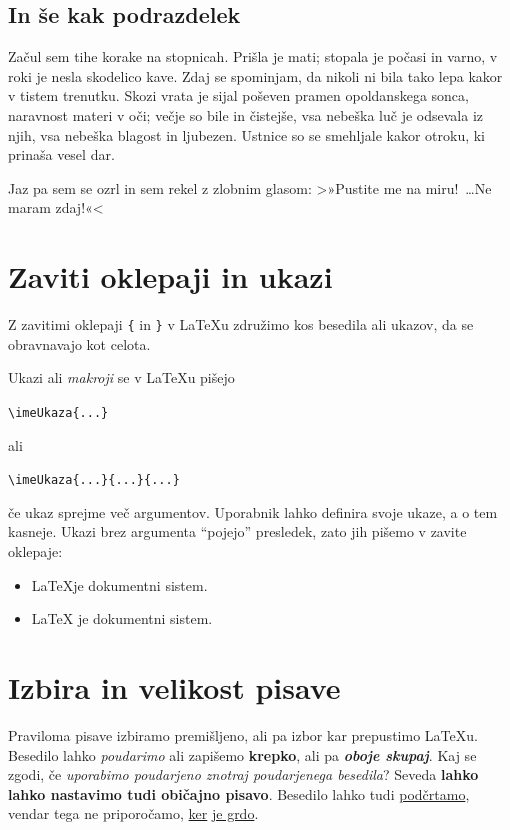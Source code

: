 \documentclass[a4paper]{article}
\begin{document}
\subsection{In še kak podrazdelek}

Začul sem tihe korake na stopnicah. Prišla je mati; stopala je počasi in varno, v roki je
nesla skodelico kave. Zdaj se spominjam, da nikoli ni bila tako lepa kakor v tistem
trenutku. Skozi vrata je sijal poševen pramen opoldanskega sonca, naravnost materi v oči;
večje so bile in čistejše, vsa nebeška luč je odsevala iz njih, vsa nebeška blagost in
ljubezen. Ustnice so se smehljale kakor otroku, ki prinaša vesel dar.

Jaz pa sem se ozrl in sem rekel z zlobnim glasom: >»Pustite me na miru!~\dots Ne maram zdaj!«<

\section{Zaviti oklepaji in ukazi}

Z zavitimi oklepaji \texttt{\{} in \texttt{\}} v LaTeXu združimo kos besedila ali ukazov,
da se obravnavajo kot celota.

Ukazi ali \emph{makroji} se v LaTeXu pišejo
%
\begin{center}
  \verb|\imeUkaza{...}|
\end{center}
%
ali
%
\begin{center}
  \verb|\imeUkaza{...}{...}{...}|
\end{center}
%
če ukaz sprejme več argumentov. Uporabnik lahko definira svoje ukaze, a o tem kasneje.
Ukazi brez argumenta ``pojejo'' presledek, zato jih pišemo v zavite oklepaje:
%
\begin{itemize}
\item \LaTeX je dokumentni sistem.
\item {\LaTeX} je dokumentni sistem.
\end{itemize}


\section{Izbira in velikost pisave}

Praviloma pisave izbiramo premišljeno, ali pa izbor kar prepustimo LaTeXu.
Besedilo lahko \emph{poudarimo} ali zapišemo \textbf{krepko}, ali pa \emph{\textbf{oboje skupaj}}.
Kaj se zgodi, če \emph{uporabimo poudarjeno \emph{znotraj} poudarjenega besedila}?
Seveda \textbf{lahko lahko nastavimo tudi \textnormal{običajno} pisavo}.
Besedilo lahko tudi \underline{podčrtamo}, vendar tega ne priporočamo, \underline{ker} \underline{je grdo}.
\end{document}
